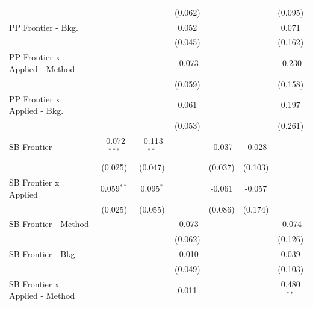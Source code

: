 \begin{tabular}{lcccccc}
                                  &                &               & (0.062)       &                &         & (0.095)\\   
   PP Frontier - Bkg.             &                &               & 0.052         &                &         & 0.071\\   
                                  &                &               & (0.045)       &                &         & (0.162)\\   
   PP Frontier x Applied - Method &                &               & -0.073        &                &         & -0.230\\   
                                  &                &               & (0.059)       &                &         & (0.158)\\   
   PP Frontier x Applied - Bkg.   &                &               & 0.061         &                &         & 0.197\\   
                                  &                &               & (0.053)       &                &         & (0.261)\\   
   SB Frontier                    & -0.072$^{***}$ & -0.113$^{**}$ &               & -0.037         & -0.028  &   \\   
                                  & (0.025)        & (0.047)       &               & (0.037)        & (0.103) &   \\   
   SB Frontier x Applied          & 0.059$^{**}$   & 0.095$^{*}$   &               & -0.061         & -0.057  &   \\   
                                  & (0.025)        & (0.055)       &               & (0.086)        & (0.174) &   \\   
   SB Frontier - Method           &                &               & -0.073        &                &         & -0.074\\   
                                  &                &               & (0.062)       &                &         & (0.126)\\   
   SB Frontier - Bkg.             &                &               & -0.010        &                &         & 0.039\\   
                                  &                &               & (0.049)       &                &         & (0.103)\\   
   SB Frontier x Applied - Method &                &               & 0.011         &                &         & 0.480$^{**}$\\   

\end{tabular}
